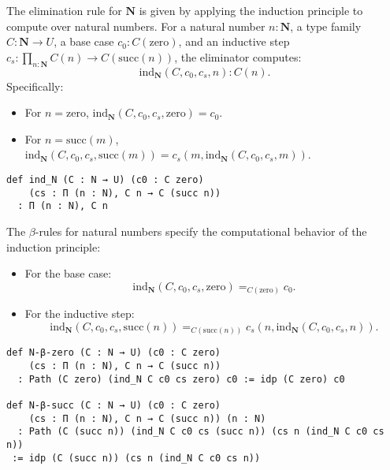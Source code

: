\documentclass{article}
\begin{document}
\begin{definition}
The elimination rule for $\mathbf{N}$ is given by applying the induction principle to compute over natural numbers. For a natural number $n : \mathbf{N}$, a type family $C : \mathbf{N} \rightarrow U$, a base case $c_0 : C(\mathrm{zero})$, and an inductive step $c_s : \prod_{n : \mathbf{N}} C(n) \rightarrow C(\mathrm{succ}(n))$, the eliminator computes:
\[
\mathrm{ind}_\mathbf{N}(C, c_0, c_s, n) : C(n).
\]
Specifically:
\begin{itemize}
    \item For $n = \mathrm{zero}$, $\mathrm{ind}_\mathbf{N}(C, c_0, c_s, \mathrm{zero}) = c_0$.
    \item For $n = \mathrm{succ}(m)$, $\mathrm{ind}_\mathbf{N}(C, c_0, c_s, \mathrm{succ}(m)) = c_s(m, \mathrm{ind}_\mathbf{N}(C, c_0, c_s, m))$.
\end{itemize}
\begin{lstlisting}[mathescape=true]
def ind_N (C : N → U) (c0 : C zero)
    (cs : Π (n : N), C n → C (succ n))
  : П (n : N), C n
\end{lstlisting}
\end{definition}

\begin{theorem}
The $\beta$-rules for natural numbers specify the computational behavior of the induction principle:
\begin{itemize}
    \item For the base case:
    \[
    \mathrm{ind}_\mathbf{N}(C, c_0, c_s, \mathrm{zero}) =_{C(\mathrm{zero})} c_0.
    \]
    \item For the inductive step:
    \[
    \mathrm{ind}_\mathbf{N}(C, c_0, c_s, \mathrm{succ}(n)) =_{C(\mathrm{succ}(n))} c_s(n, \mathrm{ind}_\mathbf{N}(C, c_0, c_s, n)).
    \]
\end{itemize}
\begin{lstlisting}[mathescape=true]
def N-β-zero (C : N → U) (c0 : C zero)
    (cs : Π (n : N), C n → C (succ n))
  : Path (C zero) (ind_N C c0 cs zero) c0 := idp (C zero) c0

def N-β-succ (C : N → U) (c0 : C zero)
    (cs : Π (n : N), C n → C (succ n)) (n : N)
  : Path (C (succ n)) (ind_N C c0 cs (succ n)) (cs n (ind_N C c0 cs n))
 := idp (C (succ n)) (cs n (ind_N C c0 cs n))
\end{lstlisting}
\end{theorem}
\end{document}
